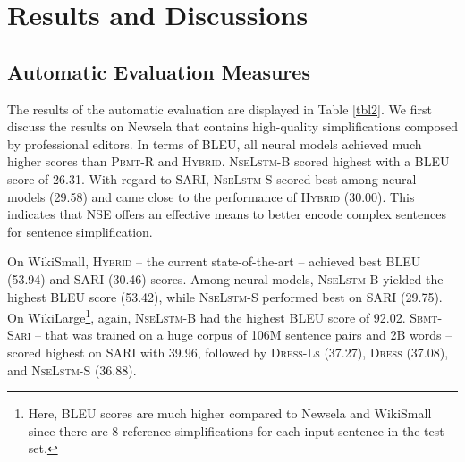 \documentclass[11pt,a4paper]{article}
\begin{document}
\section{Results and Discussions}
\subsection{Automatic Evaluation Measures}
The results of the automatic evaluation are displayed in Table \ref{tbl2}. We first discuss the results on Newsela that contains high-quality simplifications composed by professional editors. In terms of BLEU, all neural models achieved much higher scores than \textsc{Pbmt-R} and \textsc{Hybrid}. \textsc{NseLstm-B} scored highest with a BLEU score of 26.31. With regard to SARI, \textsc{NseLstm-S} scored best among neural models (29.58) and came close to the performance of \textsc{Hybrid} (30.00). This indicates that NSE offers an effective means to better encode complex sentences for sentence simplification.

On WikiSmall, \textsc{Hybrid} -- the current state-of-the-art --  achieved best BLEU (53.94) and SARI (30.46) scores. Among  neural models, \textsc{NseLstm-B} yielded the highest BLEU score (53.42), while \textsc{NseLstm-S} performed best on SARI (29.75). On WikiLarge\footnote{Here, BLEU scores are much higher compared to Newsela and WikiSmall since there are 8 reference simplifications for each input sentence in the test set.}, again, \textsc{NseLstm-B} had the highest BLEU score of 92.02. \textsc{Sbmt-Sari} -- that was trained on a huge corpus of 106M sentence pairs and 2B words -- scored highest on SARI with 39.96, followed by \textsc{Dress-Ls} (37.27), \textsc{Dress} (37.08), and \textsc{NseLstm-S} (36.88). 
\end{document}
